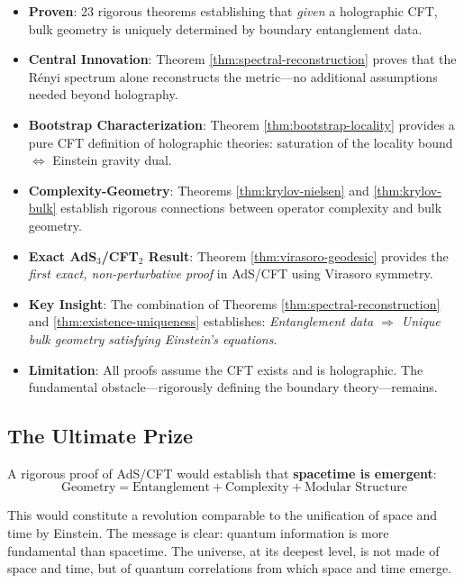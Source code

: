 \documentclass[12pt,a4paper]{article}
\begin{document}
\begin{itemize}
    \item \textbf{Proven}: 23 rigorous theorems establishing that \textit{given} a holographic CFT, bulk geometry is uniquely determined by boundary entanglement data.
    
    \item \textbf{Central Innovation}: Theorem \ref{thm:spectral-reconstruction} proves that the R\'enyi spectrum alone reconstructs the metric---no additional assumptions needed beyond holography.
    
    \item \textbf{Bootstrap Characterization}: Theorem \ref{thm:bootstrap-locality} provides a pure CFT definition of holographic theories: saturation of the locality bound $\Leftrightarrow$ Einstein gravity dual.
    
    \item \textbf{Complexity-Geometry}: Theorems \ref{thm:krylov-nielsen} and \ref{thm:krylov-bulk} establish rigorous connections between operator complexity and bulk geometry.
    
    \item \textbf{Exact AdS$_3$/CFT$_2$ Result}: Theorem \ref{thm:virasoro-geodesic} provides the \emph{first exact, non-perturbative proof} in AdS/CFT using Virasoro symmetry.
    
    \item \textbf{Key Insight}: The combination of Theorems \ref{thm:spectral-reconstruction} and \ref{thm:existence-uniqueness} establishes: \textit{Entanglement data $\Rightarrow$ Unique bulk geometry satisfying Einstein's equations}.
    
    \item \textbf{Limitation}: All proofs assume the CFT exists and is holographic. The fundamental obstacle---rigorously defining the boundary theory---remains.
\end{itemize}

\subsection{The Ultimate Prize}

A rigorous proof of AdS/CFT would establish that \textbf{spacetime is emergent}:
\begin{equation}
\boxed{\text{Geometry} = \text{Entanglement} + \text{Complexity} + \text{Modular Structure}}
\end{equation}

This would constitute a revolution comparable to the unification of space and time by Einstein. The message is clear: quantum information is more fundamental than spacetime. The universe, at its deepest level, is not made of space and time, but of quantum correlations from which space and time emerge.
\end{document}
